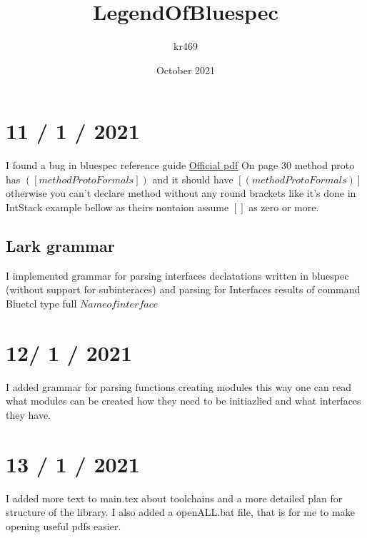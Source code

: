 \documentclass{article}
\title{LegendOfBluespec}
\author{kr469 }
\date{October 2021}
\begin{document}
\maketitle

\section{11 / 1 / 2021}
    I found a bug in bluespec reference guide
    \hyperlink{https://github.com/BSVLang/Main/blob/master/Language_Spec/bsv-reference-guide.pdf}{Official pdf}
    On page 30 method proto has $([ methodProtoFormals ])$ 
    and it should have $[( methodProtoFormals)]$ 
    otherwise you can't declare method without any round brackets like it's done in IntStack example bellow
    as theirs nontaion assume $[]$ as zero or more. 

    \subsection{Lark grammar}
         I implemented grammar for parsing interfaces declatations written in bluespec (without support for subinteraces)
         and parsing for Interfaces results of command Bluetcl type full \( Name of interface \)

\section{12/ 1 / 2021}
    I added grammar for parsing functions creating modules this way one can 
    read what modules can be created how they need to be initiazlied and what interfaces they have.  

\section{13 / 1 / 2021}
    I added more text to main.tex about toolchains and a more detailed plan for structure of the library. I also added a openALL.bat file, that is for me to make opening useful pdfs easier.
\end{document}
